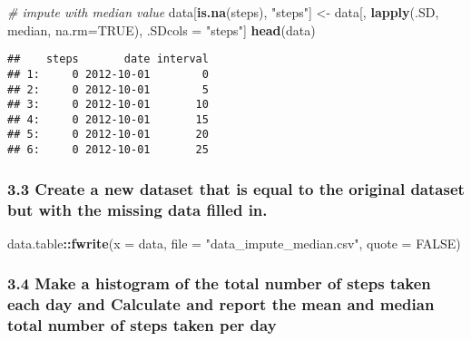 \documentclass[
]{article}
\newenvironment{Shaded}{\begin{snugshade}}{\end{snugshade}}
\newcommand{\CommentTok}[1]{\textcolor[rgb]{0.56,0.35,0.01}{\textit{#1}}}
\newcommand{\DataTypeTok}[1]{\textcolor[rgb]{0.13,0.29,0.53}{#1}}
\newcommand{\KeywordTok}[1]{\textcolor[rgb]{0.13,0.29,0.53}{\textbf{#1}}}
\newcommand{\NormalTok}[1]{#1}
\newcommand{\OperatorTok}[1]{\textcolor[rgb]{0.81,0.36,0.00}{\textbf{#1}}}
\newcommand{\OtherTok}[1]{\textcolor[rgb]{0.56,0.35,0.01}{#1}}
\newcommand{\StringTok}[1]{\textcolor[rgb]{0.31,0.60,0.02}{#1}}
\begin{document}
\begin{Shaded}
\begin{Highlighting}[]
\CommentTok{# impute with median value}
\NormalTok{data[}\KeywordTok{is.na}\NormalTok{(steps), }\StringTok{"steps"}\NormalTok{]  <-}\StringTok{ }\NormalTok{data[, }\KeywordTok{lapply}\NormalTok{(.SD, median, }\DataTypeTok{na.rm=}\OtherTok{TRUE}\NormalTok{), .SDcols =}\StringTok{ "steps"}\NormalTok{]}
\KeywordTok{head}\NormalTok{(data)}
\end{Highlighting}
\end{Shaded}

\begin{verbatim}
##    steps       date interval
## 1:     0 2012-10-01        0
## 2:     0 2012-10-01        5
## 3:     0 2012-10-01       10
## 4:     0 2012-10-01       15
## 5:     0 2012-10-01       20
## 6:     0 2012-10-01       25
\end{verbatim}

\hypertarget{create-a-new-dataset-that-is-equal-to-the-original-dataset-but-with-the-missing-data-filled-in.}{%
\subsubsection{3.3 Create a new dataset that is equal to the original
dataset but with the missing data filled
in.}\label{create-a-new-dataset-that-is-equal-to-the-original-dataset-but-with-the-missing-data-filled-in.}}

\begin{Shaded}
\begin{Highlighting}[]
\NormalTok{data.table}\OperatorTok{::}\KeywordTok{fwrite}\NormalTok{(}\DataTypeTok{x =}\NormalTok{ data, }\DataTypeTok{file =} \StringTok{"data_impute_median.csv"}\NormalTok{, }\DataTypeTok{quote =} \OtherTok{FALSE}\NormalTok{)}
\end{Highlighting}
\end{Shaded}

\hypertarget{make-a-histogram-of-the-total-number-of-steps-taken-each-day-and-calculate-and-report-the-mean-and-median-total-number-of-steps-taken-per-day}{%
\subsubsection{3.4 Make a histogram of the total number of steps taken
each day and Calculate and report the mean and median total number of
steps taken per
day}\label{make-a-histogram-of-the-total-number-of-steps-taken-each-day-and-calculate-and-report-the-mean-and-median-total-number-of-steps-taken-per-day}}
\end{document}
